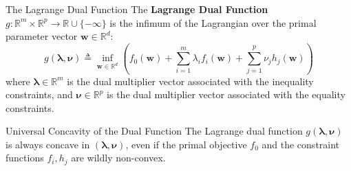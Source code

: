 \begin{definitionbox}{The Lagrange Dual Function}
The \textbf{Lagrange Dual Function} $g: \mathbb{R}^m \times \mathbb{R}^p \to \mathbb{R} \cup \{-\infty\}$ is the infimum of the Lagrangian over the primal parameter vector $\mathbf{w} \in \mathbb{R}^d$:
\begin{equation}
g(\boldsymbol{\lambda}, \boldsymbol{\nu}) \triangleq \inf_{\mathbf{w} \in \mathbb{R}^d} \left( f_0(\mathbf{w}) + \sum_{i=1}^m \lambda_i f_i(\mathbf{w}) + \sum_{j=1}^p \nu_j h_j(\mathbf{w}) \right)
\label{eq:dual_func_def}
\end{equation}
where $\boldsymbol{\lambda} \in \mathbb{R}^m$ is the dual multiplier vector associated with the inequality constraints, and $\boldsymbol{\nu} \in \mathbb{R}^p$ is the dual multiplier vector associated with the equality constraints.
\end{definitionbox}

\begin{theorembox}{Universal Concavity of the Dual Function}
The Lagrange dual function $g(\boldsymbol{\lambda}, \boldsymbol{\nu})$ is always concave in $(\boldsymbol{\lambda}, \boldsymbol{\nu})$, even if the primal objective $f_0$ and the constraint functions $f_i, h_j$ are wildly non-convex.
\end{theorembox}

